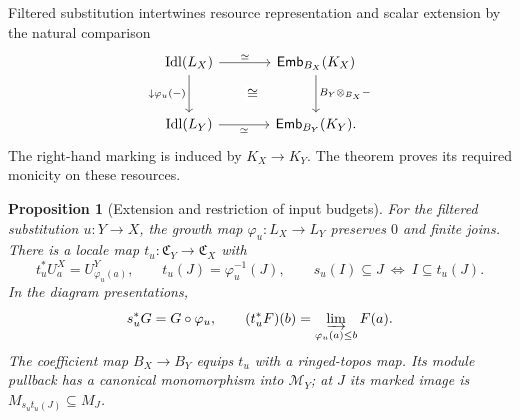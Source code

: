 \documentclass[11pt,a4paper]{article}
\numberwithin{algorithm}{section}
\numberwithin{equation}{section}
\newtheorem{proposition}[proposition]{Proposition}
\theoremstyle{definition}
\theoremstyle{remark}
\theoremstyle{plain}
\newcommand{\Idl}{\operatorname{Idl}}
\newcommand{\Emb}{\mathsf{Emb}}
\theoremstyle{definition}
\theoremstyle{plain}
\begin{document}
Filtered substitution intertwines resource representation and scalar
extension by the natural comparison
\[
\begin{tikzcd}[column sep=large,row sep=large]
 \Idl(L_X) \arrow[dr,phantom,"\cong" description] \arrow[r,"{\simeq}"] \arrow[d,"{\downarrow\varphi_u(-)}"']
   & \Emb_{B_X}(K_X) \arrow[d,"{B_Y\otimes_{B_X}-}"]\\
 \Idl(L_Y) \arrow[r,"{\simeq}"'] & \Emb_{B_Y}(K_Y).
\end{tikzcd}
\]
The right-hand marking is induced by $K_X\to K_Y$.
The theorem proves its required monicity on these resources.


\begin{proposition}[Extension and restriction of input budgets]
\label{prop:input-budget-adjunction}
For the filtered substitution $u:Y\to X$, the growth map
$\varphi_u:L_X\to L_Y$ preserves $0$ and finite joins. There is
a locale map $t_u:\mathfrak C_Y\to\mathfrak C_X$ with
\[
 t_u^*U_a^X=U_{\varphi_u(a)}^Y,\qquad
 t_u(J)=\varphi_u^{-1}(J),\qquad
 s_u(I)\subseteq J\ \Longleftrightarrow\ I\subseteq t_u(J).
\]
In the diagram presentations,
\begin{equation}\label{eq:input-kan}
 s_u^*G=G\circ\varphi_u,\qquad
 (t_u^*F)(b)=\varinjlim_{\varphi_u(a)\le b}F(a).
\end{equation}
The coefficient map $B_X\to B_Y$ equips $t_u$ with a ringed-topos
map. Its module pullback has a canonical monomorphism into
$\mathscr M_Y$; at $J$ its marked image is
$M_{s_ut_u(J)}\subseteq M_J$.
\end{proposition}
\end{document}
